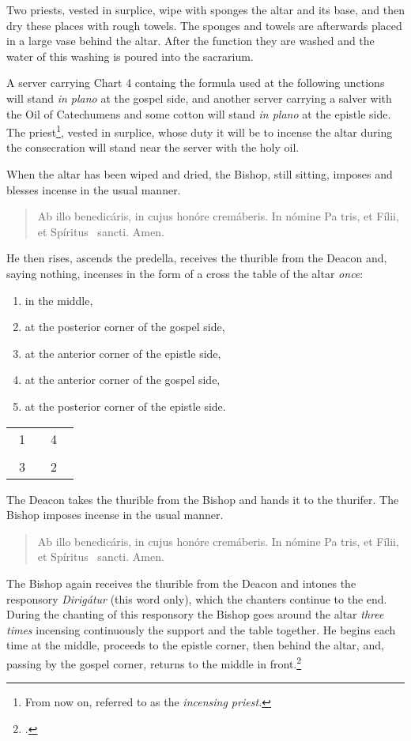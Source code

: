 \documentclass[letterpaper]{report}
\newcommand\blessincense{
\begin{quote}
   Ab illo benedicáris, in cujus honóre cremáberis. In nómine Pa\cross
    tris, et Fí\cross lii, et Spíritus \cross\ sancti. \rbar Amen.
\end{quote}
}
\newcommand\crossplan{
\begin{center}
    \begin{tabular}{ | l c r | }
       \hline
        \cross\ {\tiny 1} &         & {\tiny 4} \cross\ \\
                           & \cross &           \\
        \cross\ {\tiny 3} &         & {\tiny 2} \cross\ \\
       \hline
   \end{tabular} 
\end{center}
}
\begin{document}
{    \rubric Two priests, vested in surplice, wipe with sponges the altar and
    its base, and then dry these places with rough towels. The sponges and
    towels are afterwards placed in a large vase behind the altar. After the
    function they are washed and the water of this washing is poured into the
    sacrarium.

    \rubric A server carrying Chart 4 containg the formula used at the
    following unctions will stand \textit{in plano} at the gospel side, and
    another server carrying a salver with the Oil of Catechumens and some
    cotton will stand \textit{in plano} at the epistle side. The
    priest\footnote{From now on, referred to as the \textit{incensing
    priest.}}, vested in surplice, whose duty it will be to incense the altar
    during the consecration will stand near the server with the holy oil.

    \rubric When the altar has been wiped and dried, the Bishop, still sitting,
    imposes and blesses incense in the usual manner. 

    \blessincense

    He then rises, ascends the predella, receives the thurible from the Deacon
    and, saying nothing, incenses in the form of a cross the table of the altar
    \textit{once}: 

    \begin{enumerate}
        \item in the middle,
        \item at the posterior corner of the gospel side,
        \item at the anterior corner of the epistle side,
        \item at the anterior corner of the gospel side,
        \item at the posterior corner of the epistle side.
    \end{enumerate}

    \crossplan

    \rubric The Deacon takes the thurible from the Bishop and hands it to the
    thurifer. The Bishop imposes incense in the usual manner.

    \blessincense

    The Bishop again receives the thurible from the Deacon and intones the
    responsory \textit{Dirig\'atur} (this word only), which the chanters
    continue to the end. During the chanting of this responsory the Bishop goes
    around the altar \textit{three times} incensing continuously the support
    and the table together. He begins each time at the middle, proceeds to the
    epistle corner, then behind the altar, and, passing by the gospel corner,
    returns to the middle in front.\footcite[If the back of the altar is
    attached to the wall, he begins at the middle, incenses the support as fas
    as the epistle corner, afterwards the table from the epistle to the gospel
    side, then the side of the altar at the gospel side, then the side of the
    altar at the gospel corner and finally the support from the gospel corner
    to the middle.][footnote 1, p. 96.]{consecranda}

}
\end{document}
